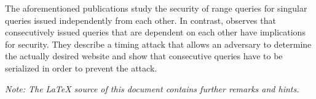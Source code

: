 \documentclass[a4paper]{llncs}
\begin{document}
The aforementioned publications study the security of range queries for singular queries issued independently from each other. In contrast, \cite{FederrathFHP11-dnsmixes} observes that consecutively issued queries that are dependent on each other have implications for security. They describe a timing attack that allows an adversary to determine the actually desired website and show that consecutive queries have to be serialized in order to prevent the attack.

\bigskip
\noindent\emph{Note: The LaTeX source of this document contains further remarks and hints.}







\end{document}
